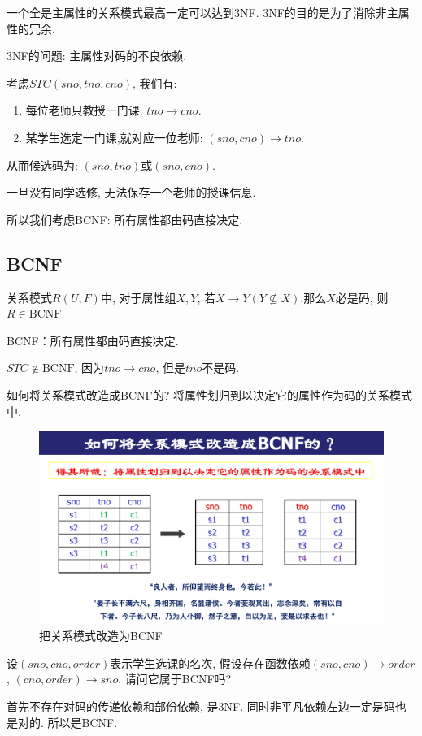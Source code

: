 \begin{remark}
  一个全是主属性的关系模式最高一定可以达到3NF. 3NF的目的是为了消除非主属性的冗余.
\end{remark}

3NF的问题: 主属性对码的不良依赖.

\begin{example}
  考虑$STC(sno,tno,cno)$, 我们有:
  \begin{enumerate}
      \item 每位老师只教授一门课: $tno \to cno$.
      \item 某学生选定一门课,就对应一位老师: $(sno,cno)\to tno$.
  \end{enumerate}

  从而候选码为: $(sno, tno)$或$(sno,cno)$. 
  
  一旦没有同学选修, 无法保存一个老师的授课信息.
\end{example}

所以我们考虑BCNF: 所有属性都由码直接决定.

\subsection{BCNF}

\begin{definition}[BCNF]
  关系模式$R(U,F)$中, 对于属性组$X,Y$, 若$X\to Y(Y\nsubseteq X)$,那么$X$必是码, 则$R\in\text{BCNF}$.
\end{definition}

BCNF：所有属性都由码直接决定.

$STC\notin \text{BCNF}$, 因为$tno\to cno$, 但是$tno$不是码.

如何将关系模式改造成BCNF的? 将属性划归到以决定它的属性作为码的关系模式中.

\begin{figure}[H]
    \centering
    \includegraphics[width=.6\textwidth]{./figure/BCNF.pdf}
    \caption{把关系模式改造为BCNF}
\end{figure}


\begin{example}
  设$(sno,cno,order)$表示学生选课的名次, 假设存在函数依赖$(sno,cno)\to order$, $(cno,order)\to sno$, 请问它属于BCNF吗?

  首先不存在对码的传递依赖和部份依赖, 是3NF. 同时非平凡依赖左边一定是码也是对的. 所以是BCNF.
\end{example}

